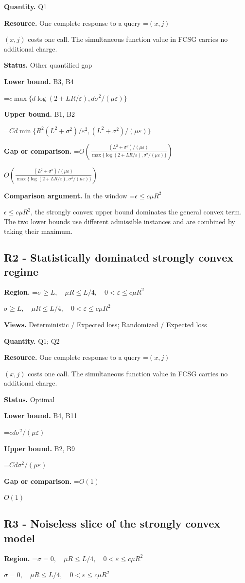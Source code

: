 \documentclass[10pt,a4paper]{article}
\newcommand{\AtlasMath}[1]{\par\begingroup\centering\setbox0=\hbox{$\displaystyle #1$}\ifdim\wd0>1.4\linewidth\typeout{ATLAS WIDE FORMULA: \the\wd0}\fi\ifdim\wd0>\linewidth\resizebox{\linewidth}{!}{\box0}\else\box0\fi\par\endgroup}
\newcommand{\AtlasInlineMath}[1]{\begingroup\setbox0=\hbox{$#1$}\ifdim\wd0>.4\linewidth\endgroup\AtlasMath{#1}\else\endgroup$#1$\fi}
\begin{document}
\textbf{Quantity.} Q1

\textbf{Resource.} One complete response to a query \AtlasInlineMath{(x,j)} costs one call. The simultaneous function value in FCSG carries no additional charge.

\textbf{Status.} Other quantified gap

\textbf{Lower bound.} B3, B4

\AtlasMath{c\max\{d\log(2+LR/\varepsilon),d\sigma^2/(\mu\varepsilon)\}}
\textbf{Upper bound.} B1, B2

\AtlasMath{Cd\min\{R^2(L^2+\sigma^2)/\varepsilon^2,(L^2+\sigma^2)/(\mu\varepsilon)\}}
\textbf{Gap or comparison.} \AtlasInlineMath{O\!\left(\frac{(L^2+\sigma^2)/(\mu\varepsilon)}{\max\{\log(2+LR/\varepsilon),\sigma^2/(\mu\varepsilon)\}}\right)}

\textbf{Comparison argument.} In the window \AtlasInlineMath{\epsilon\le c\mu R^2}, the strongly convex upper bound dominates the general convex term. The two lower bounds use different admissible instances and are combined by taking their maximum.

\subsection{R2 - Statistically dominated strongly convex regime}
\textbf{Region.} \AtlasInlineMath{\sigma\ge L,\quad\mu R\le L/4,\quad0<\varepsilon\le c\mu R^2}

\textbf{Views.} Deterministic / Expected loss; Randomized / Expected loss

\textbf{Quantity.} Q1; Q2

\textbf{Resource.} One complete response to a query \AtlasInlineMath{(x,j)} costs one call. The simultaneous function value in FCSG carries no additional charge.

\textbf{Status.} Optimal

\textbf{Lower bound.} B4, B11

\AtlasMath{cd\sigma^2/(\mu\varepsilon)}
\textbf{Upper bound.} B2, B9

\AtlasMath{Cd\sigma^2/(\mu\varepsilon)}
\textbf{Gap or comparison.} \AtlasInlineMath{O(1)}

\subsection{R3 - Noiseless slice of the strongly convex model}
\textbf{Region.} \AtlasInlineMath{\sigma=0,\quad\mu R\le L/4,\quad0<\varepsilon\le c\mu R^2}
\end{document}

